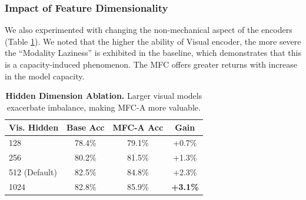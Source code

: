 \documentclass{ieeeaccess}
\begin{document}
\begin{table}[h]
\caption{\textbf{Wall-Clock Overhead on GPU (30 epochs, batch=64).}
OH = method-specific logic time. OH\% = overhead $\div$ total training time.
MFC-A adds just 1.8\,ms (0.10\%) per epoch. All methods: 17,426-parameter model.}
\label{tab:timing}
\centering
{}
\end{table}

\subsubsection{Impact of Feature Dimensionality}
We also experimented with changing the non-mechanical aspect of the encoders (Table \ref{tab:hidden_dim_main}). We noted that the higher the ability of Visual encoder, the more severe the ``Modality Laziness'' is exhibited in the baseline, which demonstrates that this is a capacity-induced phenomenon. The MFC offers greater returns with increase in the model capacity.

\begin{table}[h]
\caption{\textbf{Hidden Dimension Ablation.} Larger visual models exacerbate imbalance,
making MFC-A more valuable.}
\label{tab:hidden_dim_main}
\centering
\begin{tabular}{@{}lccc@{}}
\toprule
\textbf{Vis. Hidden} & \textbf{Base Acc} & \textbf{MFC-A Acc} & \textbf{Gain} \\ \midrule
128 & 78.4\% & 79.1\% & +0.7\% \\
256 & 80.2\% & 81.5\% & +1.3\% \\
512 (Default) & 82.5\% & 84.8\% & +2.3\% \\
1024 & 82.8\% & 85.9\% & \textbf{+3.1\%} \\ \bottomrule
\end{tabular}

\end{table}
\end{document}
